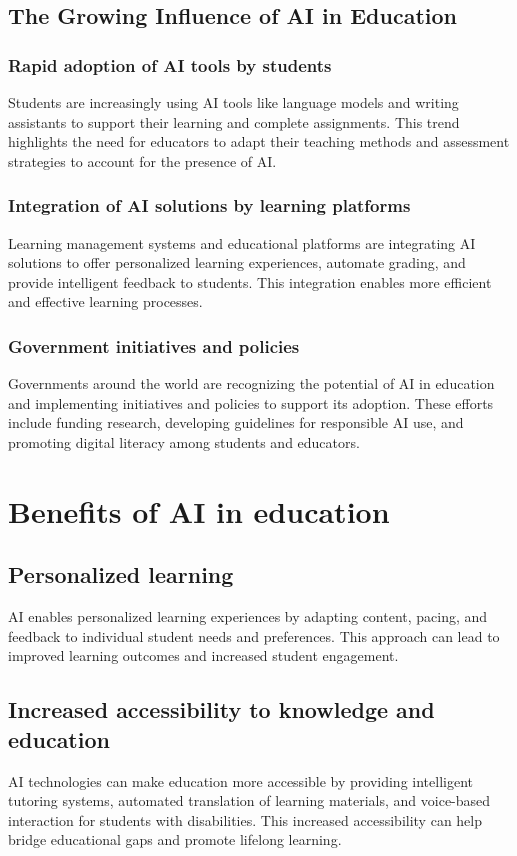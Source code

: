 \documentclass{article}
\begin{document}
\subsection{The Growing Influence of AI in Education}

\subsubsection{Rapid adoption of AI tools by students}
Students are increasingly using AI tools like language models and writing assistants to support their learning and complete assignments. This trend highlights the need for educators to adapt their teaching methods and assessment strategies to account for the presence of AI.

\subsubsection{Integration of AI solutions by learning platforms}
Learning management systems and educational platforms are integrating AI solutions to offer personalized learning experiences, automate grading, and provide intelligent feedback to students. This integration enables more efficient and effective learning processes.

\subsubsection{Government initiatives and policies}
Governments around the world are recognizing the potential of AI in education and implementing initiatives and policies to support its adoption. These efforts include funding research, developing guidelines for responsible AI use, and promoting digital literacy among students and educators.

\section{Benefits of AI in education}

\subsection{Personalized learning}
AI enables personalized learning experiences by adapting content, pacing, and feedback to individual student needs and preferences. This approach can lead to improved learning outcomes and increased student engagement.

\subsection{Increased accessibility to knowledge and education}
AI technologies can make education more accessible by providing intelligent tutoring systems, automated translation of learning materials, and voice-based interaction for students with disabilities. This increased accessibility can help bridge educational gaps and promote lifelong learning.
\end{document}
